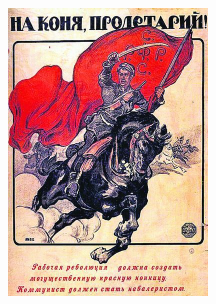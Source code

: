 \documentclass[12pt, a4paper]{article}\usepackage[]{graphicx}\usepackage[]{color}
\begin{document}
\begin{center}
\includegraphics[height=3in]{figures/proletarii.jpg}
\end{center}
\end{document}
